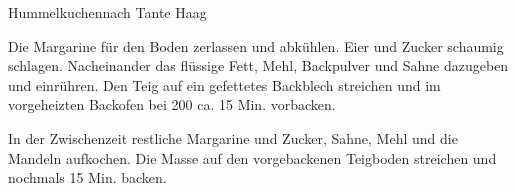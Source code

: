 \begin{recipe}{Hummelkuchen}{nach Tante Haag}
  \label{Hummelkuchen}


  \steps
  Die Margarine für den Boden zerlassen und abkühlen. Eier und Zucker schaumig schlagen.
  Nacheinander das flüssige Fett, Mehl, Backpulver und Sahne dazugeben und einrühren. Den
  Teig auf ein gefettetes Backblech streichen und im vorgeheizten Backofen bei 200
  \celsius ca. 15 Min. vorbacken.

  In der Zwischenzeit restliche Margarine und Zucker, Sahne, Mehl und die Mandeln aufkochen.
  Die Masse auf den vorgebackenen Teigboden streichen und nochmals 15 Min. backen.
\end{recipe}
